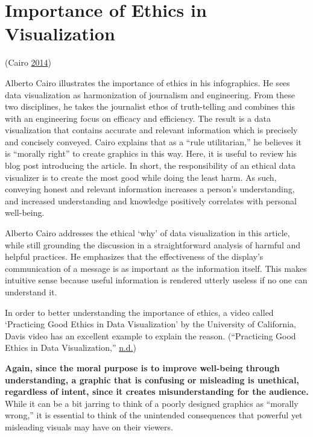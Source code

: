 \documentclass[]{book}
\begin{document}
\hypertarget{importance-of-ethics-in-visualization}{%
\section{Importance of Ethics in Visualization}\label{importance-of-ethics-in-visualization}}

(Cairo \protect\hyperlink{ref-ethical_infographics}{2014})

Alberto Cairo illustrates the importance of ethics in his infographics. He sees data visualization as harmonization of journalism and engineering. From these two disciplines, he takes the journalist ethos of truth-telling and combines this with an engineering focus on efficacy and efficiency. The result is a data visualization that contains accurate and relevant information which is precisely and concisely conveyed. Cairo explains that as a ``rule utilitarian,'' he believes it is ``morally right'' to create graphics in this way. Here, it is useful to review his blog post introducing the article. In short, the responsibility of an ethical data visualizer is to create the most good while doing the least harm. As such, conveying honest and relevant information increases a person's understanding, and increased understanding and knowledge positively correlates with personal well-being.

Alberto Cairo addresses the ethical `why' of data visualization in this article, while still grounding the discussion in a straightforward analysis of harmful and helpful practices. He emphasizes that the effectiveness of the display's communication of a message is as important as the information itself. This makes intuitive sense because useful information is rendered utterly useless if no one can understand it.

In order to better understanding the importance of ethics, a video called `Practicing Good Ethics in Data Visualization' by the University of California, Davis video has an excellent example to explain the reason. (``Practicing Good Ethics in Data Visualization,'' \protect\hyperlink{ref-Practicing_Good_Ethics_in_Data_Visualization}{n.d.})

\textbf{Again, since the moral purpose is to improve well-being through understanding, a graphic that is confusing or misleading is unethical, regardless of intent, since it creates misunderstanding for the audience.} While it can be a bit jarring to think of a poorly designed graphics as ``morally wrong,'' it is essential to think of the unintended consequences that powerful yet misleading visuals may have on their viewers.
\end{document}
